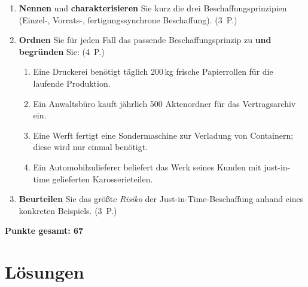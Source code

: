 \documentclass[11pt, a4paper]{article}
\begin{document}
\medskip
\begin{enumerate}[label=(\alph*)]
  \item \textbf{Nennen} und \textbf{charakterisieren} Sie kurz die drei Beschaffungs\-prinzipien (Einzel-, Vorrats-, fertigungssynchrone Beschaffung). \hfill (3~P.)
  \item \textbf{Ordnen} Sie für jeden Fall das passende Beschaffungs\-prinzip zu \textbf{und begründen} Sie: \hfill (4~P.)
    \begin{enumerate}[label=\arabic*., leftmargin=*]
      \item Eine Druckerei benötigt täglich 200\,kg frische Papierrollen für die laufende Produktion.
      \item Ein Anwaltsbüro kauft jährlich 500 Aktenordner für das Vertragsarchiv ein.
      \item Eine Werft fertigt eine Sondermaschine zur Verladung von Containern; diese wird nur einmal benötigt.
      \item Ein Automobil\-zulieferer beliefert das Werk seines Kunden mit just-in-time gelieferten Karosserieteilen.
    \end{enumerate}
  \item \textbf{Beurteilen} Sie das größte \emph{Risiko} der Just-in-Time-Beschaffung anhand eines konkreten Beispiels. \hfill (3~P.)
\end{enumerate}

\vspace{1em}
\noindent\textbf{Punkte gesamt: 67}

\newpage

\section{Lösungen}\label{loesungen}
\end{document}
